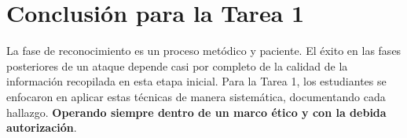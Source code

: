 \documentclass[12pt,a4paper]{article}
\begin{document}
\section{Conclusión para la Tarea 1}

La fase de reconocimiento es un proceso metódico y paciente. El éxito en las fases posteriores de un ataque depende casi por completo de la calidad de la información recopilada en esta etapa inicial. Para la Tarea 1, los estudiantes se enfocaron en aplicar estas técnicas de manera sistemática, documentando cada hallazgo. \textbf{Operando siempre dentro de un marco ético y con la debida autorización}.
\end{document}
